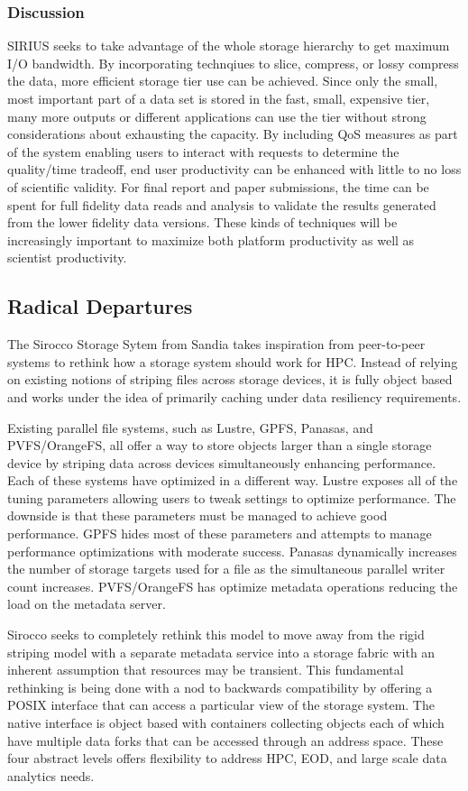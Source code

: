 \subsubsection{Discussion}
SIRIUS seeks to take advantage of the whole storage hierarchy to get maximum
I/O bandwidth. By incorporating technqiues to slice, compress, or lossy
compress the data, more efficient storage tier use can be achieved. Since only
the small, most important part of a data set is stored in the fast, small,
expensive tier, many more outputs or different applications can use the tier
without strong considerations about exhausting the capacity. By including QoS
measures as part of the system enabling users to interact with requests to
determine the quality/time tradeoff, end user productivity can be enhanced with
little to no loss of scientific validity. For final report and paper
submissions, the time can be spent for full fidelity data reads and analysis to
validate the results generated from the lower fidelity data versions. These
kinds of techniques will be increasingly important to maximize both platform
productivity as well as scientist productivity.

\subsection{Radical Departures}
The Sirocco Storage Sytem from Sandia takes inspiration from peer-to-peer
systems to rethink how a storage system should work for HPC. Instead of relying
on existing notions of striping files across storage devices, it is fully
object based and works under the idea of primarily caching under data
resiliency requirements.

Existing parallel file systems, such as Lustre, GPFS, Panasas, and
PVFS/OrangeFS, all offer a way to store objects larger than a single storage
device by striping data across devices simultaneously enhancing performance.
Each of these systems have optimized in a different way. Lustre exposes all of
the tuning parameters allowing users to tweak settings to optimize performance.
The downside is that these parameters must be managed to achieve good
performance. GPFS hides most of these parameters and attempts to manage
performance optimizations with moderate success. Panasas dynamically increases
the number of storage targets used for a file as the simultaneous parallel
writer count increases. PVFS/OrangeFS has optimize metadata operations reducing
the load on the metadata server.

Sirocco seeks to completely rethink this model to move away from the rigid
striping model with a separate metadata service into a storage fabric with an
inherent assumption that resources may be transient. This fundamental
rethinking is being done with a nod to backwards compatibility by offering a
POSIX interface that can access a particular view of the storage system. The
native interface is object based with containers collecting objects each of
which have multiple data forks that can be accessed through an address space.
These four abstract levels offers flexibility to address HPC, EOD, and large
scale data analytics needs.

